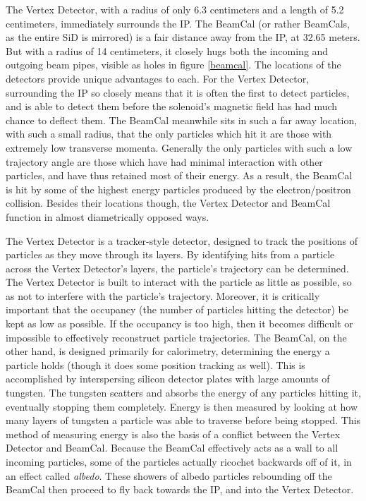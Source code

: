 \documentclass{report}
\begin{document}
                The Vertex Detector, with a radius of only 6.3 centimeters and a length of 5.2 centimeters, immediately surrounds the IP. The BeamCal (or rather BeamCals, as the entire SiD is mirrored) is a fair distance away from the IP, at 32.65 meters. But with a radius of 14 centimeters, it closely hugs both the incoming and outgoing beam pipes, visible as holes in figure \ref{beamcal}. The locations of the detectors provide unique advantages to each. For the Vertex Detector, surrounding the IP so closely means that it is often the first to detect particles, and is able to detect them before the solenoid's magnetic field has had much chance to deflect them. The BeamCal meanwhile sits in such a far away location, with such a small radius, that the only particles which hit it are those with extremely low transverse momenta. Generally the only particles with such a low trajectory angle are those which have had minimal interaction with other particles, and have thus retained most of their energy. As a result, the BeamCal is hit by some of the highest energy particles produced by the electron/positron collision. Besides their locations though, the Vertex Detector and BeamCal function in almost diametrically opposed ways.

                The Vertex Detector is a tracker-style detector, designed to track the positions of particles as they move through its layers. By identifying hits from a particle across the Vertex Detector's layers, the particle's trajectory can be determined. The Vertex Detector is built to interact with the particle as little as possible, so as not to interfere with the particle's trajectory. Moreover, it is critically important that the occupancy (the number of particles hitting the detector) be kept as low as possible. If the occupancy is too high, then it becomes difficult or impossible to effectively reconstruct particle trajectories. The BeamCal, on the other hand, is designed primarily for calorimetry, determining the energy a particle holds (though it does some position tracking as well). This is accomplished by interspersing silicon detector plates with large amounts of tungsten. The tungsten scatters and absorbs the energy of any particles hitting it, eventually stopping them completely. Energy is then measured by looking at how many layers of tungsten a particle was able to traverse before being stopped. This method of measuring energy is also the basis of a conflict between the Vertex Detector and BeamCal. Because the BeamCal effectively acts as a wall to all incoming particles, some of the particles actually ricochet backwards off of it, in an effect called \textit{albedo}. These showers of albedo particles rebounding off the BeamCal then proceed to fly back towards the IP, and into the Vertex Detector.
                
\end{document}
